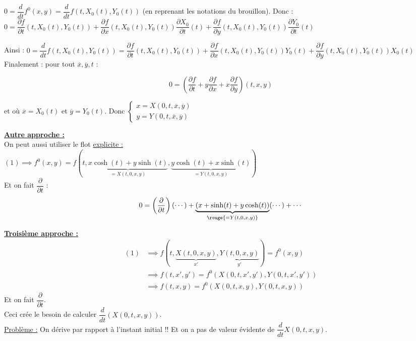 \documentclass[12pt,a4paper]{article}
\begin{document}
\begin{sol}
\begin{minipage}{18.5cm}
				$0 = \dfrac{d}{dt}f^0(x,y) = \dfrac{d}{d t}f(t,X_0(t),Y_0(t))$ (en reprenant les notations du brouillon). Donc :\\
				$0 = \dfrac{\partial f}{\partial t} (t,X_0(t),Y_0(t)) + \dfrac{\partial f}{\partial x}(t,X_0(t),Y_0(t))\dfrac{\partial X_0}{\partial t}(t) + \dfrac{\partial f}{\partial y}(t,X_0(t),Y_0(t))\dfrac{\partial Y_0}{\partial t}(t)$
				
				Ainsi : $0 = \dfrac{d }{d t} f(t,X_0(t),Y_0(t)) = \dfrac{\partial f}{\partial t} (t,X_0(t),Y_0(t)) + \dfrac{\partial f}{\partial x}(t,X_0(t),Y_0(t))Y_0(t) + \dfrac{\partial f}{\partial y}(t,X_0(t),Y_0(t))X_0(t)$\\
				
				Finalement : pour tout $\overline{x},\overline{y},t$ :
				
				\[0 = \left(\dfrac{\partial f}{\partial t}+y\dfrac{\partial f}{\partial x}+x\dfrac{\partial f}{\partial y}\right)(t,x,y)\]
				
				et où $\overline{x} = X_0(t)$ et $\overline{y} = Y_0(t)$. Donc $\begin{cases}
					x = X(0,t,\overline x,\overline y)\\
					y = Y(0,t,\overline x,\overline y)
				\end{cases}$
				
				\textbf{\underline{Autre approche :}}\\
				
				On peut aussi utiliser le flot \underline{explicite :}\\
				$(1) \implies f^0(x,y) = f(t,\underbrace{x\cosh(t)+y\sinh(t)}_{=X(t,0,x,y)},\underbrace{y\cosh(t)+x\sinh(t)}_{=Y(t,0,x,y)})$\\
				Et on fait $\dfrac{\partial}{\partial t}$ :
				\[0 = \left(\dfrac{\partial}{\partial t}\right)(\cdots) + \underbrace{\left(x+\sinh(t)+y\cosh(t)\right)}_{\rouge{=Y(t,0,x,y)}}(\cdots)+\cdots\]
				
				\textbf{\underline{Troisième approche :}}\\
				\[\begin{aligned}
					(1) 
					& \implies f(t,\underbrace{X(t,0,x,y)}_{x'},\underbrace{Y(t,0,x,y)}_{y'}) = f^0(x,y)\\
					& \implies f(t,x',y') = f^0(X(0,t,x',y'),Y(0,t,x',y'))\\
					& \implies f(t,x,y) = f^0(X(0,t,x,y),Y(0,t,x,y))
				\end{aligned}\]
				Et on fait $\dfrac{\partial}{\partial t}$.\\
				Ceci crée le besoin de calculer $\dfrac{d}{dt}\left(X(0,t,x,y)\right)$.\\
				\underline{Problème :} On dérive par rapport à l'instant initial !! Et on a pas de valeur évidente de $\dfrac{d}{dt}X(0,t,x,y)$.
				

\end{minipage}
\end{sol}
\end{document}
